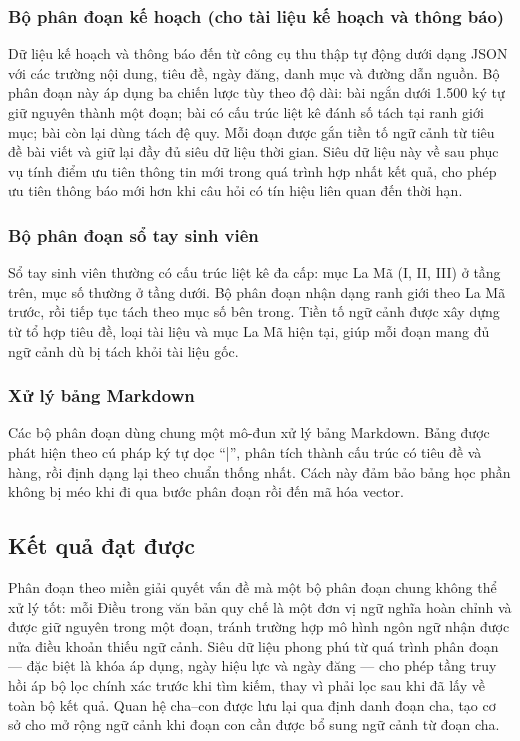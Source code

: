 \documentclass[../DoAn.tex]{subfiles}
\begin{document}
\subsubsection{Bộ phân đoạn kế hoạch (cho tài liệu kế hoạch và thông báo)}

Dữ liệu kế hoạch và thông báo đến từ công cụ thu thập tự động dưới dạng JSON
với các trường nội dung, tiêu đề, ngày đăng, danh mục và đường dẫn nguồn. Bộ
phân đoạn này áp dụng ba chiến lược tùy theo độ dài: bài ngắn dưới 1.500 ký tự
giữ nguyên thành một đoạn; bài có cấu trúc liệt kê đánh số tách tại ranh giới
mục; bài còn lại dùng tách đệ quy. Mỗi đoạn được gắn tiền tố ngữ cảnh từ tiêu
đề bài viết và giữ lại đầy đủ siêu dữ liệu thời gian. Siêu dữ liệu này về sau
phục vụ tính điểm ưu tiên thông tin mới trong quá trình hợp nhất kết quả, cho
phép ưu tiên thông báo mới hơn khi câu hỏi có tín hiệu liên quan đến thời hạn.

\subsubsection{Bộ phân đoạn sổ tay sinh viên}

Sổ tay sinh viên thường có cấu trúc liệt kê đa cấp: mục La Mã (I, II, III) ở
tầng trên, mục số thường ở tầng dưới. Bộ phân đoạn nhận dạng ranh giới theo La
Mã trước, rồi tiếp tục tách theo mục số bên trong. Tiền tố ngữ cảnh được xây
dựng từ tổ hợp tiêu đề, loại tài liệu và mục La Mã hiện tại, giúp mỗi đoạn
mang đủ ngữ cảnh dù bị tách khỏi tài liệu gốc.

\subsubsection{Xử lý bảng Markdown}

Các bộ phân đoạn dùng chung một mô-đun xử lý bảng Markdown. Bảng được phát
hiện theo cú pháp ký tự dọc ``|'', phân tích thành cấu trúc có tiêu đề và hàng,
rồi định dạng lại theo chuẩn thống nhất. Cách này đảm bảo bảng học phần không
bị méo khi đi qua bước phân đoạn rồi đến mã hóa vector.

\subsection{Kết quả đạt được}

Phân đoạn theo miền giải quyết vấn đề mà một bộ phân đoạn chung không thể xử
lý tốt: mỗi Điều trong văn bản quy chế là một đơn vị ngữ nghĩa hoàn chỉnh và
được giữ nguyên trong một đoạn, tránh trường hợp mô hình ngôn ngữ nhận được nửa
điều khoản thiếu ngữ cảnh. Siêu dữ liệu phong phú từ quá trình phân đoạn ---
đặc biệt là khóa áp dụng, ngày hiệu lực và ngày đăng --- cho phép tầng truy hồi
áp bộ lọc chính xác trước khi tìm kiếm, thay vì phải lọc sau khi đã lấy về
toàn bộ kết quả. Quan hệ cha--con được lưu lại qua định danh đoạn cha, tạo cơ
sở cho mở rộng ngữ cảnh khi đoạn con cần được bổ sung ngữ cảnh từ đoạn cha.
\end{document}
